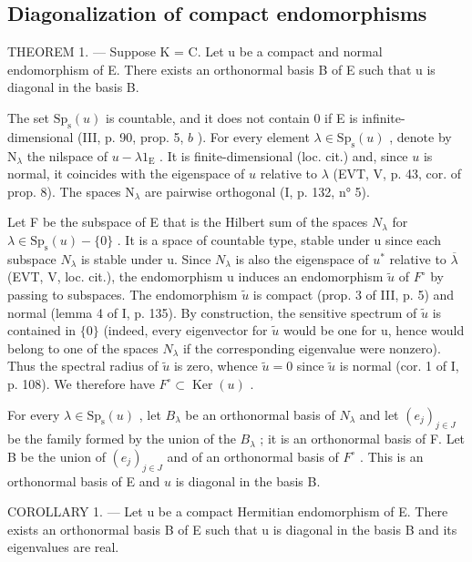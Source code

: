 \subsection{Diagonalization of compact endomorphisms}

THEOREM 1. --- Suppose K = C. Let u be a compact and normal endomorphism of E. There exists an orthonormal basis B of E such that u is diagonal in the basis B.

The set \(\mathrm{Sp}_{\mathrm{s}}(u)\) is countable, and it does not contain 0 if E is infinite-dimensional (III, p. 90, prop. 5, \(b\) ). For every element \(\lambda \in \mathrm{Sp}_{\mathrm{s}}(u)\) , denote by \(\mathrm{N}_{\lambda}\) the nilspace of \(u - \lambda 1_{\mathrm{E}}\) . It is finite-dimensional (loc. cit.) and, since \(u\) is normal, it coincides with the eigenspace of \(u\) relative to \(\lambda\) (EVT, V, p. 43, cor. of prop. 8). The spaces \(\mathrm{N}_{\lambda}\) are pairwise orthogonal (I, p. 132, n° 5).

Let F be the subspace of E that is the Hilbert sum of the spaces \(N_{\lambda}\) for \(\lambda \in \mathrm{Sp}_{\mathrm{s}}(u) - \{0\}\) . It is a space of countable type, stable under u since each subspace \(N_{\lambda}\) is stable under u. Since \(N_{\lambda}\) is also the eigenspace of \(u^{*}\) relative to \(\overline{\lambda}\) (EVT, V, loc. cit.), the endomorphism u induces an endomorphism \(\widetilde{u}\) of \(F^{\circ}\) by passing to subspaces. The endomorphism \(\widetilde{u}\) is compact (prop. 3 of III, p. 5) and normal (lemma 4 of I, p. 135). By construction, the sensitive spectrum of \(\widetilde{u}\) is contained in \(\{0\}\) (indeed, every eigenvector for \(\widetilde{u}\) would be one for u, hence would belong to one of the spaces \(N_{\lambda}\) if the corresponding eigenvalue were nonzero). Thus the spectral radius of \(\widetilde{u}\) is zero, whence \(\widetilde{u}=0\) since \(\widetilde{u}\) is normal (cor. 1 of I, p. 108). We therefore have \(F^{\circ}\subset\operatorname{Ker}(u)\) .

For every \(\lambda \in \mathrm{Sp}_{\mathrm{s}}(u)\) , let \(B_{\lambda}\) be an orthonormal basis of \(N_{\lambda}\) and let \((e_j)_{j \in J}\) be the family formed by the union of the \(B_{\lambda}\) ; it is an orthonormal basis of F. Let B be the union of \((e_j)_{j \in J}\) and of an orthonormal basis of \(F^{\circ}\) . This is an orthonormal basis of E and \(u\) is diagonal in the basis B.

COROLLARY 1. --- Let u be a compact Hermitian endomorphism of E. There exists an orthonormal basis B of E such that u is diagonal in the basis B and its eigenvalues are real.

